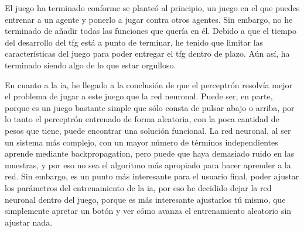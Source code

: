 El juego ha terminado conforme se planteó al principio, un juego en el que puedes entrenar a un agente y ponerlo a jugar contra otros agentes. Sin embargo, no he terminado de añadir todas las funciones que quería en él. Debido a que el tiempo del desarrollo del \gls{tfg} está a punto de terminar, he tenido que limitar las características del juego para poder entregar el \gls{tfg} dentro de plazo. Aún así, ha terminado siendo algo de lo que estar orgulloso.

En cuanto a la \gls{ia}, he llegado a la conclusión de que el perceptrón resolvía mejor el problema de jugar a este juego que la red neuronal. Puede ser, en parte, porque es un juego bastante simple que sólo consta de pulsar abajo o arriba, por lo tanto el perceptrón entrenado de forma aleatoria, con la poca cantidad de pesos que tiene, puede encontrar una solución funcional. La red neuronal, al ser un sistema más complejo, con un mayor número de términos independientes aprende mediante backpropagation, pero puede que haya demasiado ruido en las muestras, y por eso no sea el algoritmo más apropiado para hacer aprender a la red. Sin embargo, es un punto más interesante para el usuario final, poder ajustar los parámetros del entrenamiento de la \gls{ia}, por eso he decidido dejar la red neuronal dentro del juego, porque es más interesante ajustarlos tú mismo, que simplemente apretar un botón y ver cómo avanza el entrenamiento aleatorio sin ajustar nada.